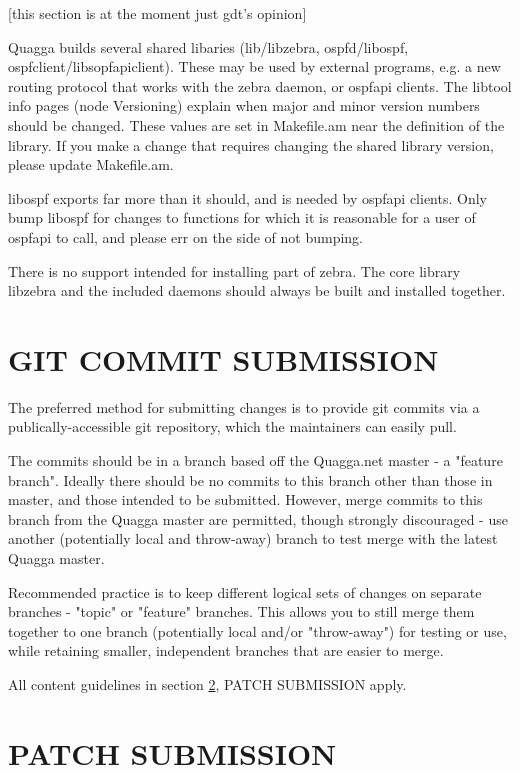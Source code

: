 \documentclass[oneside]{article}
\begin{document}
[this section is at the moment just gdt's opinion]

Quagga builds several shared libaries (lib/libzebra, ospfd/libospf, 
ospfclient/libsopfapiclient).  These may be used by external programs,
e.g. a new routing protocol that works with the zebra daemon, or
ospfapi clients.  The libtool info pages (node Versioning) explain
when major and minor version numbers should be changed.  These values
are set in Makefile.am near the definition of the library.  If you
make a change that requires changing the shared library version,
please update Makefile.am.

libospf exports far more than it should, and is needed by ospfapi
clients.  Only bump libospf for changes to functions for which it is
reasonable for a user of ospfapi to call, and please err on the side
of not bumping.

There is no support intended for installing part of zebra.  The core
library libzebra and the included daemons should always be built and
installed together.


\section{GIT COMMIT SUBMISSION}
\label{sec:git-submission}

The preferred method for submitting changes is to provide git commits via a
publically-accessible git repository, which the maintainers can easily pull.

The commits should be in a branch based off the Quagga.net master - a
"feature branch".  Ideally there should be no commits to this branch other
than those in master, and those intended to be submitted.  However, merge
commits to this branch from the Quagga master are permitted, though strongly
discouraged - use another (potentially local and throw-away) branch to test
merge with the latest Quagga master.

Recommended practice is to keep different logical sets of changes on
separate branches - "topic" or "feature" branches.  This allows you to still
merge them together to one branch (potentially local and/or "throw-away")
for testing or use, while retaining smaller, independent branches that are
easier to merge.

All content guidelines in section \ref{sec:patch-submission}, PATCH
SUBMISSION apply.


\section{PATCH SUBMISSION}
\label{sec:patch-submission}
\end{document}

